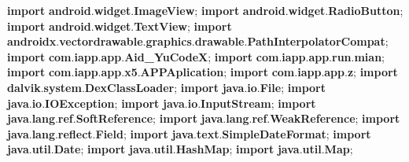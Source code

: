 \documentclass[
]{article}
\newenvironment{Shaded}{}{}
\newcommand{\ImportTok}[1]{\textcolor[rgb]{0.00,0.50,0.00}{\textbf{#1}}}
\newcommand{\KeywordTok}[1]{\textcolor[rgb]{0.00,0.44,0.13}{\textbf{#1}}}
\newcommand{\OperatorTok}[1]{\textcolor[rgb]{0.40,0.40,0.40}{#1}}
\begin{document}
\begin{Shaded}
\begin{Highlighting}[]
\KeywordTok{import} \ImportTok{android}\OperatorTok{.}\ImportTok{widget}\OperatorTok{.}\ImportTok{ImageView}\OperatorTok{;}
\KeywordTok{import} \ImportTok{android}\OperatorTok{.}\ImportTok{widget}\OperatorTok{.}\ImportTok{RadioButton}\OperatorTok{;}
\KeywordTok{import} \ImportTok{android}\OperatorTok{.}\ImportTok{widget}\OperatorTok{.}\ImportTok{TextView}\OperatorTok{;}
\KeywordTok{import} \ImportTok{androidx}\OperatorTok{.}\ImportTok{vectordrawable}\OperatorTok{.}\ImportTok{graphics}\OperatorTok{.}\ImportTok{drawable}\OperatorTok{.}\ImportTok{PathInterpolatorCompat}\OperatorTok{;}
\KeywordTok{import} \ImportTok{com}\OperatorTok{.}\ImportTok{iapp}\OperatorTok{.}\ImportTok{app}\OperatorTok{.}\ImportTok{Aid\_YuCodeX}\OperatorTok{;}
\KeywordTok{import} \ImportTok{com}\OperatorTok{.}\ImportTok{iapp}\OperatorTok{.}\ImportTok{app}\OperatorTok{.}\ImportTok{run}\OperatorTok{.}\ImportTok{mian}\OperatorTok{;}
\KeywordTok{import} \ImportTok{com}\OperatorTok{.}\ImportTok{iapp}\OperatorTok{.}\ImportTok{app}\OperatorTok{.}\ImportTok{x5}\OperatorTok{.}\ImportTok{APPAplication}\OperatorTok{;}
\KeywordTok{import} \ImportTok{com}\OperatorTok{.}\ImportTok{iapp}\OperatorTok{.}\ImportTok{app}\OperatorTok{.}\ImportTok{z}\OperatorTok{;}
\KeywordTok{import} \ImportTok{dalvik}\OperatorTok{.}\ImportTok{system}\OperatorTok{.}\ImportTok{DexClassLoader}\OperatorTok{;}
\KeywordTok{import} \ImportTok{java}\OperatorTok{.}\ImportTok{io}\OperatorTok{.}\ImportTok{File}\OperatorTok{;}
\KeywordTok{import} \ImportTok{java}\OperatorTok{.}\ImportTok{io}\OperatorTok{.}\ImportTok{IOException}\OperatorTok{;}
\KeywordTok{import} \ImportTok{java}\OperatorTok{.}\ImportTok{io}\OperatorTok{.}\ImportTok{InputStream}\OperatorTok{;}
\KeywordTok{import} \ImportTok{java}\OperatorTok{.}\ImportTok{lang}\OperatorTok{.}\ImportTok{ref}\OperatorTok{.}\ImportTok{SoftReference}\OperatorTok{;}
\KeywordTok{import} \ImportTok{java}\OperatorTok{.}\ImportTok{lang}\OperatorTok{.}\ImportTok{ref}\OperatorTok{.}\ImportTok{WeakReference}\OperatorTok{;}
\KeywordTok{import} \ImportTok{java}\OperatorTok{.}\ImportTok{lang}\OperatorTok{.}\ImportTok{reflect}\OperatorTok{.}\ImportTok{Field}\OperatorTok{;}
\KeywordTok{import} \ImportTok{java}\OperatorTok{.}\ImportTok{text}\OperatorTok{.}\ImportTok{SimpleDateFormat}\OperatorTok{;}
\KeywordTok{import} \ImportTok{java}\OperatorTok{.}\ImportTok{util}\OperatorTok{.}\ImportTok{Date}\OperatorTok{;}
\KeywordTok{import} \ImportTok{java}\OperatorTok{.}\ImportTok{util}\OperatorTok{.}\ImportTok{HashMap}\OperatorTok{;}
\KeywordTok{import} \ImportTok{java}\OperatorTok{.}\ImportTok{util}\OperatorTok{.}\ImportTok{Map}\OperatorTok{;}


\end{Highlighting}
\end{Shaded}
\end{document}
